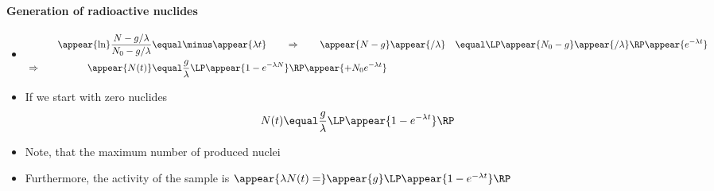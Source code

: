 \begin{frame}
\frametitle{\texorpdfstring{\culine[\sectiontitleulinecolor]{\sectiontitle}}{\sectiontitle} }
\framesubtitle{Generation of radioactive nuclides}%

\begin{itemize}
	\item[] $$
\begin{aligned}
& & \appear{\ln} \frac{N-g / \lambda}{N_{0}-g / \lambda} & \equal  \minus \appear{\lambda t} \qquad \Rightarrow \qquad \appear{N-g} \appear{/ \lambda}& \equal  \LP \appear{N_{0}-g} \appear{/ \lambda} \RP  \appear{e^{-\lambda t}} \\
&\Rightarrow \quad& \appear{N(t)}& \equal \frac{g}{\lambda} \LP \appear{1-e^{-\lambda N}} \RP \appear{+N_{0} e^{-\lambda t}}
\end{aligned}
$$

\item If we start with zero nuclides
\[
N(t)  \equal \frac{g}{\lambda} \LP \appear{1-e^{-\lambda t}} \RP 
\]

\item Note, that the maximum number of produced nuclei 

\item Furthermore, the activity of the sample is $\appear{\lambda N(t)=}\appear{g} \LP \appear{1-e^{-\lambda t}} \RP $  
\end{itemize}

\endofslide 
\end{frame}

